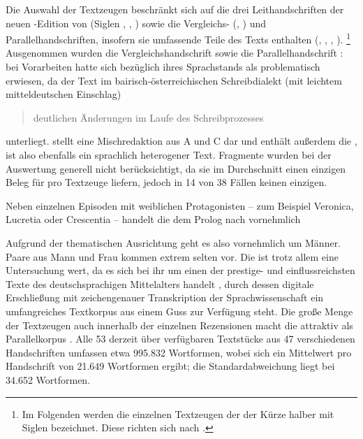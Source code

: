 Die Auswahl der Textzeugen beschränkt sich auf die drei Leithandschriften der
neuen \KC{}-Edition von \citeauthor{chincaetal2019b}
(Siglen \cite{kc:A1}, \cite{kc:B1}, \cite{kc:C1}) sowie die Vergleichs- (\cite{kc:H}, \cite{kc:VB})
und Parallelhandschriften, insofern sie umfassende Teile des Texts enthalten
(\cite{kc:M}, \cite{kc:P}, \cite{kc:K}, \cite{kc:Z}).%
%
	\footnote{Im Folgenden werden die einzelnen Textzeugen der \KC{} der
	Kürze halber mit Siglen bezeichnet. Diese richten sich nach
	 \autocite{kcdigital}.}
%
Ausgenommen wurden die Vergleichshandschrift \citet{kc:VC} sowie die
Parallelhandschrift \citet{kc:W}: bei Vorarbeiten hatte sich \citet{kc:VC}
bezüglich ihres Sprachstands als problematisch erwiesen, da der Text im
bairisch-österreichischen Schreibdialekt (mit leichtem mitteldeutschen
Einschlag) \blockcquote[73]{wolf:kckat}{deutlichen Änderungen im Laufe des
Schreibprozesses} unterliegt. \citet{kc:W} stellt eine Mischredaktion aus A und
C dar und enthält außerdem die 
\autocite[48--54]{weis2022}, ist also ebenfalls ein sprachlich heterogener
Text. Fragmente wurden bei der Auswertung generell nicht berücksichtigt, da sie
im Durchschnitt einen einzigen Beleg für  pro Textzeuge liefern,
jedoch in 14 von 38 Fällen keinen einzigen.

Neben einzelnen Episoden mit weiblichen Protagonisten -- zum Beispiel Veronica,
Lucretia oder Crescentia \autocite[729--838, 4335--4772,
11518--12808]{schroeder1895} -- handelt die \KC{} dem Prolog nach
vornehmlich

\blockcquote[][\pno~19--20]{schroeder1895}[]{

}

Aufgrund der thematischen Ausrichtung geht es also vornehmlich um Männer. Paare
aus Mann und Frau kommen extrem selten vor. Die \KC{} ist trotz allem
eine Untersuchung wert, da es sich bei ihr um einen der prestige- und
einflussreichsten Texte des deutschsprachigen Mittelalters handelt
\autocite[93]{wolf2008}, durch dessen digitale Erschließung mit zeichengenauer
Transkription \autocite{kcdigital} der Sprachwissenschaft ein umfangreiches
Textkorpus aus einem Guss zur Verfügung steht. Die große Menge der Textzeugen
auch innerhalb der einzelnen Rezensionen macht die \KC{} attraktiv als
Parallelkorpus \autocite{cysouwwaelchli2007}. Alle 53 derzeit über
 verfügbaren Textstücke aus 47 verschiedenen Handschriften
umfassen etwa 995.832 Wortformen, wobei sich ein Mittelwert pro Handschrift von
21.649 Wortformen ergibt; die Standardabweichung liegt bei 34.652 Wortformen.

